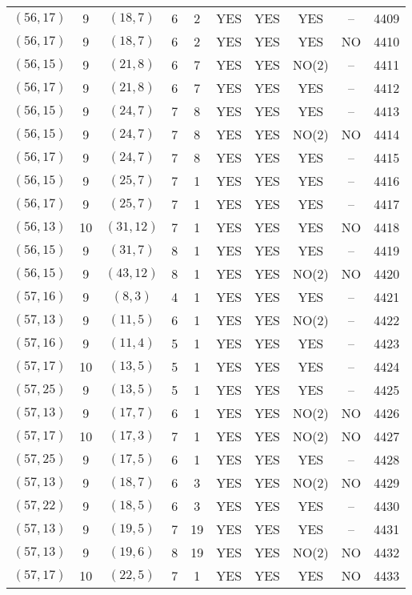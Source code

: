 \begin{longtable}{|c|c|c|c|c|c|c|c|c|c|}
$(56, 17)$ & 9 & $(18, 7)$ & 6 & 2 & YES & YES & YES & -- & 4409\\
$(56, 17)$ & 9 & $(18, 7)$ & 6 & 2 & YES & YES & YES & NO & 4410\\
$(56, 15)$ & 9 & $(21, 8)$ & 6 & 7 & YES & YES & NO(2) & -- & 4411\\
$(56, 17)$ & 9 & $(21, 8)$ & 6 & 7 & YES & YES & YES & -- & 4412\\
$(56, 15)$ & 9 & $(24, 7)$ & 7 & 8 & YES & YES & YES & -- & 4413\\
$(56, 15)$ & 9 & $(24, 7)$ & 7 & 8 & YES & YES & NO(2) & NO & 4414\\
$(56, 17)$ & 9 & $(24, 7)$ & 7 & 8 & YES & YES & YES & -- & 4415\\
$(56, 15)$ & 9 & $(25, 7)$ & 7 & 1 & YES & YES & YES & -- & 4416\\
$(56, 17)$ & 9 & $(25, 7)$ & 7 & 1 & YES & YES & YES & -- & 4417\\
$(56, 13)$ & 10 & $(31, 12)$ & 7 & 1 & YES & YES & YES & NO & 4418\\
$(56, 15)$ & 9 & $(31, 7)$ & 8 & 1 & YES & YES & YES & -- & 4419\\
$(56, 15)$ & 9 & $(43, 12)$ & 8 & 1 & YES & YES & NO(2) & NO & 4420\\
$(57, 16)$ & 9 & $(8, 3)$ & 4 & 1 & YES & YES & YES & -- & 4421\\
$(57, 13)$ & 9 & $(11, 5)$ & 6 & 1 & YES & YES & NO(2) & -- & 4422\\
$(57, 16)$ & 9 & $(11, 4)$ & 5 & 1 & YES & YES & YES & -- & 4423\\
$(57, 17)$ & 10 & $(13, 5)$ & 5 & 1 & YES & YES & YES & -- & 4424\\
$(57, 25)$ & 9 & $(13, 5)$ & 5 & 1 & YES & YES & YES & -- & 4425\\
$(57, 13)$ & 9 & $(17, 7)$ & 6 & 1 & YES & YES & NO(2) & NO & 4426\\
$(57, 17)$ & 10 & $(17, 3)$ & 7 & 1 & YES & YES & NO(2) & NO & 4427\\
$(57, 25)$ & 9 & $(17, 5)$ & 6 & 1 & YES & YES & YES & -- & 4428\\
$(57, 13)$ & 9 & $(18, 7)$ & 6 & 3 & YES & YES & NO(2) & NO & 4429\\
$(57, 22)$ & 9 & $(18, 5)$ & 6 & 3 & YES & YES & YES & -- & 4430\\
$(57, 13)$ & 9 & $(19, 5)$ & 7 & 19 & YES & YES & YES & -- & 4431\\
$(57, 13)$ & 9 & $(19, 6)$ & 8 & 19 & YES & YES & NO(2) & NO & 4432\\
$(57, 17)$ & 10 & $(22, 5)$ & 7 & 1 & YES & YES & YES & NO & 4433\\

\end{longtable}
